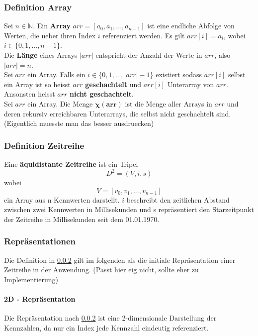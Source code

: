 \documentclass[12pt]{article}
\begin{document}
		\subsubsection{Definition Array}
		\label{sec: def}
		Sei $n \in \mathbb{N}$. Ein \textbf{Array} $arr = [a_{0}, a_{1}, ..., a_{n-1}]$ ist eine endliche Abfolge von Werten, die ueber ihren Index $i$ referenziert werden. Es gilt $arr[i] = a_{i}$, wobei $i \in \{0,1, ..., n-1\}$. \\[0.2cm]
		Die \textbf{Länge} eines Arrays $|arr|$ entspricht der Anzahl der Werte in $arr$, also $|arr| = n$.\\[0.4cm]
		Sei $arr$ ein Array. Falls ein $i \in \{0,1, ..., |arr| - 1\}$ existiert sodass $arr[i]$ selbst ein Array ist so heisst $arr$ \textbf{geschachtelt} und $arr[i]$ Unterarray von $arr$. Ansonsten heisst $arr$ \textbf{nicht geschachtelt}.\\[0.4cm]
		Sei $arr$ ein Array. Die Menge $\boldsymbol{\chi(arr)}$ ist die Menge aller Arrays in $arr$ und deren rekursiv erreichbaren Unterarrays, die selbst nicht geschachtelt sind. (Eigentlich muesste man das besser ausdruecken)
		\subsubsection{Definition Zeitreihe}
		\label{sec: def}
		Eine \textbf{äquidistante Zeitreihe} ist ein Tripel 
			\begin{equation}
				D^{2} = (V, i, s)
			\end{equation}
		wobei
			\begin{equation}
				V = [v_{0}, v_{1}, ..., v_{n - 1}]
			\end{equation}
		ein Array aus n Kennwerten darstellt.
		$i$ beschreibt den zeitlichen Abstand zwischen zwei Kennwerten in Millisekunden und s repräsentiert den Starzeitpunkt der Zeitreihe in 		Millisekunden seit dem 01.01.1970.
		\subsubsection{Repräsentationen}
		Die Definition in \ref{sec: def} gilt im folgenden als die initiale Repräsentation einer Zeitreihe in der Anwendung. (Passt hier eig nicht, sollte eher zu Implementierung)
		
			\paragraph{2D - Repräsentation}
				Die Repräsentation nach \ref{sec: def} ist eine 2-dimensionale Darstellung der Kennzahlen, da nur ein Index jede Kennzahl 						eindeutig referenziert.
				
\end{document}
